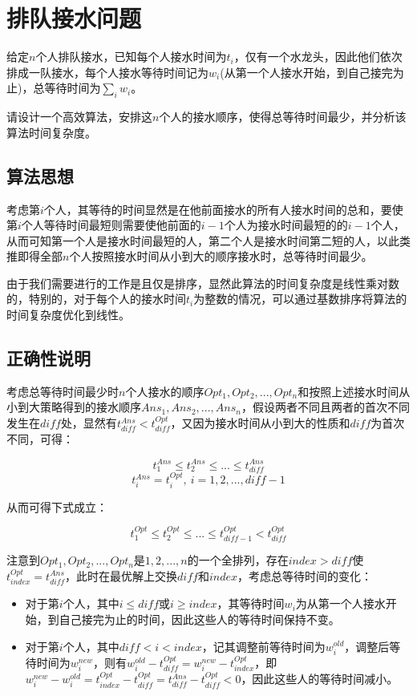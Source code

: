 \documentclass{article}
\begin{document}
\section{排队接水问题}

给定$n$个人排队接水，已知每个人接水时间为$t_i$，仅有一个水龙头，因此他们依次排成一队接水，每个人接水等待时间记为$w_i$(从第一个人接水开始，到自己接完为止)，总等待时间为$\sum_i{w_i}$。

请设计一个高效算法，安排这$n$个人的接水顺序，使得总等待时间最少，并分析该算法时间复杂度。

\subsection{算法思想}

考虑第$i$个人，其等待的时间显然是在他前面接水的所有人接水时间的总和，要使第$i$个人等待时间最短则需要使他前面的$i-1$个人为接水时间最短的的$i-1$个人，从而可知第一个人是接水时间最短的人，第二个人是接水时间第二短的人，以此类推即得全部$n$个人按照接水时间从小到大的顺序接水时，总等待时间最少。

由于我们需要进行的工作是且仅是排序，显然此算法的时间复杂度是线性乘对数的，特别的，对于每个人的接水时间$t_i$为整数的情况，可以通过基数排序将算法的时间复杂度优化到线性。

\subsection{正确性说明}

考虑总等待时间最少时$n$个人接水的顺序$Opt_1,Opt_2,...,Opt_n$和按照上述接水时间从小到大策略得到的接水顺序$Ans_1,Ans_2,...,Ans_n$，假设两者不同且两者的首次不同发生在$diff$处，显然有$t^{Ans}_{diff}<t^{Opt}_{diff}$，又因为接水时间从小到大的性质和$diff$为首次不同，可得：

$$
t^{Ans}_1\le{t}^{Ans}_2\le...\le{t}^{Ans}_{diff}
$$
$$
t^{Ans}_i=t^{Opt}_i,\ i=1,2,...,diff-1
$$

从而可得下式成立：

$$
t^{Opt}_1\le{t}^{Opt}_2\le...\le{t}^{Opt}_{diff-1}<t^{Opt}_{diff}
$$

注意到$Opt_1,Opt_2,...,Opt_n$是$1,2,...,n$的一个全排列，存在$index>diff$使$t^{Opt}_{index}=t^{Ans}_{diff}$，此时在最优解上交换$diff$和$index$，考虑总等待时间的变化：

\begin{itemize}[itemindent=3em]
    \item 对于第$i$个人，其中$i\le{diff}$或$i\ge{index}$，其等待时间$w_i$为从第一个人接水开始，到自己接完为止的时间，因此这些人的等待时间保持不变。
    \item 对于第$i$个人，其中$diff<i<index$，记其调整前等待时间为$w^{old}_i$，调整后等待时间为$w^{new}_i$，则有$w^{old}_i-t^{Opt}_{diff}=w^{new}_i-t^{Opt}_{index}$，即$w^{new}_i-w^{old}_i=t^{Opt}_{index}-t^{Opt}_{diff}={t}^{Ans}_{diff}-t^{Opt}_{diff}<0$，因此这些人的等待时间减小。
\end{itemize}
\end{document}
